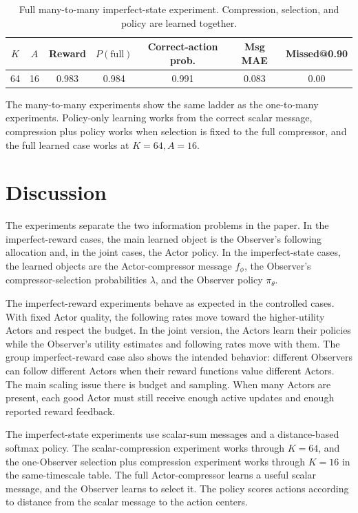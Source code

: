 \documentclass[11pt]{article}
\begin{document}
\begin{table}[H]
\centering
\small
\begin{tabular}{ccccccc}
\toprule
\(K\) & \(A\) & Reward & \(P(\mathrm{full})\) & Correct-action prob. & Msg MAE & Missed@0.90 \\
\midrule
64 & 16 & 0.983 & 0.984 & 0.991 & 0.083 & 0.00 \\
\bottomrule
\end{tabular}
\caption{Full many-to-many imperfect-state experiment. Compression, selection,
and policy are learned together.}
\label{tab:many-to-many-full}
\end{table}

The many-to-many experiments show the same ladder as the one-to-many
experiments. Policy-only learning works from the correct scalar message,
compression plus policy works when selection is fixed to the full compressor,
and the full learned case works at \(K=64,A=16\).

\section{Discussion}

The experiments separate the two information problems in the paper. In the
imperfect-reward cases, the main learned object is the Observer's following
allocation and, in the joint cases, the Actor policy. In the imperfect-state
cases, the learned objects are the Actor-compressor message \(f_\phi\), the
Observer's compressor-selection probabilities \(\lambda\), and the Observer
policy \(\pi_\theta\).

The imperfect-reward experiments behave as expected in the controlled cases. With
fixed Actor quality, the following rates move toward the higher-utility Actors
and respect the budget. In the joint version, the Actors learn their policies
while the Observer's utility estimates and following rates move with them. The
group imperfect-reward case also shows the intended behavior: different
Observers can follow different Actors when their reward functions value
different Actors. The main scaling issue there is budget and sampling. When
many Actors are present, each good Actor must still receive enough active
updates and enough reported reward feedback.

The imperfect-state experiments use scalar-sum messages and a distance-based
softmax policy. The scalar-compression experiment works through \(K=64\), and
the one-Observer selection plus compression experiment works through \(K=16\)
in the same-timescale table. The full Actor-compressor learns a useful scalar
message, and the Observer learns to select it. The policy scores actions
according to distance from the scalar message to the action centers.
\end{document}
